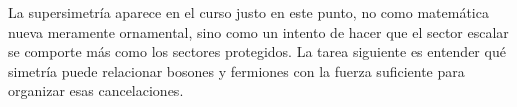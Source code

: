 La supersimetría aparece en el curso justo en este punto, no como matemática nueva meramente ornamental, sino como un intento de hacer que el sector escalar se comporte más como los sectores protegidos. La tarea siguiente es entender qué simetría puede relacionar bosones y fermiones con la fuerza suficiente para organizar esas cancelaciones.